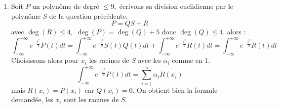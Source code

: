 \begin{enumerate}
\item  Soit $P$ un polyn\^{o}me de degr\'{e} $\leq 9,$ \'{e}crivons sa
division euclidienne par le polyn\^{o}me $S$ de la question
pr\'{e}c\'{e}dente. 
\[
P=QS+R 
\]
avec $\deg (R)\leq 4,$ $\deg (P)=\deg (Q)+5$ donc $\deg (Q)\leq 4$. alors : 
\[
\int_{-\infty }^{+\infty }e^{-\frac{t^{2}}{2}}P(t)dt=\int_{-\infty
}^{+\infty }e^{-\frac{t^{2}}{2}}S(t)Q(t)dt+\int_{-\infty }^{+\infty }e^{-%
\frac{t^{2}}{2}}R(t)dt=\int_{-\infty }^{+\infty }e^{-\frac{t^{2}}{2}}R(t)dt 
\]
Choisissons alors pour $x_{i}$ les racines de $S$ avec les $\alpha _{i}$
comme en 1. 
\[
\int_{-\infty }^{+\infty }e^{-\frac{t^{2}}{2}}P(t)dt=\sum_{i=1}^{5}\alpha
_{i}R(x_{i}) 
\]
mais $R(x_{i})=P(x_{i})$ car $Q(x_{i})=0$. On obtient bien la formule
demand\'{e}e, les $x_{i}$ sont les racines de $S$.
\end{enumerate}


